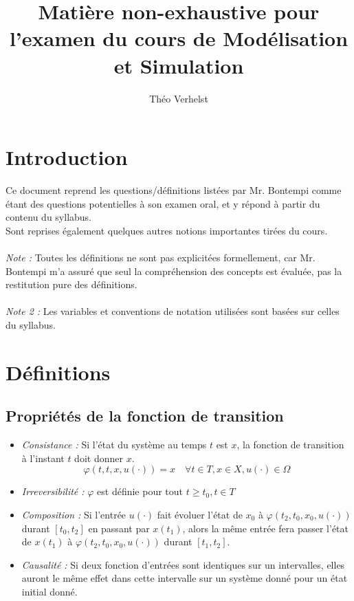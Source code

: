 \documentclass[a4paper]{article}
\author{Théo Verhelst}
\title{Matière non-exhaustive pour l'examen du cours de Modélisation et
Simulation}
\begin{document}
\maketitle
\tableofcontents
\section{Introduction}
Ce document reprend les questions/définitions listées par Mr. Bontempi comme
étant des questions potentielles à son examen oral, et y répond à partir du
contenu du syllabus.\\
Sont reprises également quelques autres notions importantes tirées du cours.
\paragraph{}
\emph{Note :} Toutes les définitions ne sont pas explicitées formellement, car
Mr. Bontempi m'a assuré que seul la compréhension des concepts est évaluée, pas
la restitution pure des définitions.
\paragraph{}
\emph{Note 2 :} Les variables et conventions de notation utilisées sont basées
sur celles du syllabus.
\section{Définitions}
\subsection{Propriétés de la fonction de transition}
\begin{itemize}
	\item \emph{Consistance :} Si l'état du système au temps $t$ est $x$,
		la fonction de transition à l'instant $t$ doit donner $x$.
		\[\varphi(t,t,x,u(\cdot))=x\quad\forall t\in T, x\in X,
		u(\cdot)\in\Omega\]
	\item \emph{Irreversibilité :} $\varphi$ est définie pour tout
		\(t \ge t_0, t\in T\)
	\item \emph{Composition :} Si l'entrée $u(\cdot)$ fait évoluer l'état de
		$x_0$ à $\varphi(t_2,t_0,x_0,u(\cdot))$ durant $[t_0,t_2]$ en passant
		par $x(t_1)$, alors la même entrée fera passer l'état de $x(t_1)$ à
		$\varphi(t_2,t_0,x_0,u(\cdot))$ durant $[t_1,t_2]$.
	\item \emph{Causalité :} Si deux fonction d'entrées sont identiques sur un
		intervalles, elles auront le même effet dans cette intervalle sur un
		système donné pour un état initial donné.
\end{itemize}
\end{document}
